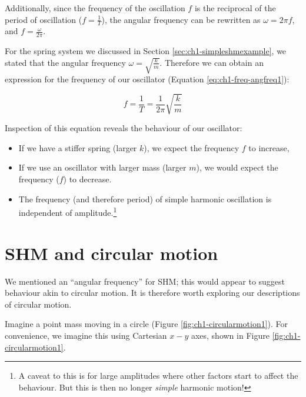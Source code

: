 \documentclass[
]{book}
\providecommand{\tightlist}{%
  \setlength{\itemsep}{0pt}\setlength{\parskip}{0pt}}
\begin{document}
Additionally, since the frequency of the oscillation \(f\) is the reciprocal of the period of oscillation (\(f = \frac{1}{T}\)), the angular frequency can be rewritten as \(\omega = 2\pi f\), and \(f = \frac{\omega}{2\pi}\).

For the spring system we discussed in Section \ref{sec:ch1-simpleshmexample}, we stated that the angular frequency \(\omega = \sqrt{\frac{k}{m}}\). Therefore we can obtain an expression for the frequency of our oscillator (Equation \eqref{eq:ch1-freq-angfreq1}):

\begin{equation}
f = \frac{1}{T} = \frac{1}{2\pi}\sqrt{\frac{k}{m}}
\label{eq:ch1-freq-angfreq1}
\end{equation}

Inspection of this equation reveals the behaviour of our oscillator:

\begin{itemize}
\tightlist
\item
  If we have a stiffer spring (larger \(k\)), we expect the frequency \(f\) to increase,
\item
  If we use an oscillator with larger mass (larger \(m\)), we would expect the frequency (\(f\)) to decrease.
\item
  The frequency (and therefore period) of simple harmonic oscillation is independent of amplitude.\footnote{A caveat to this is for large amplitudes where other factors start to affect the behaviour. But this is then no longer \emph{simple} harmonic motion!}
\end{itemize}

\hypertarget{sec:ch1-shmcircmotion1}{%
\section{SHM and circular motion}\label{sec:ch1-shmcircmotion1}}

We mentioned an ``angular frequency'' for SHM; this would appear to suggest behaviour akin to circular motion. It is therefore worth exploring our descriptions of circular motion.

Imagine a point mass moving in a circle (Figure \ref{fig:ch1-circularmotion1}). For convenience, we imagine this using Cartesian \(x-y\) axes, shown in Figure \ref{fig:ch1-circularmotion1}.
\end{document}
